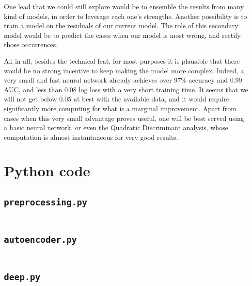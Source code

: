 \documentclass[a4paper,11pt,openany,extrafontsizes,oneside,article,twocolumn]{memoir}
\begin{document}
One lead that we could still explore would be to ensemble the results
from many kind of models, in order to leverage each one's
strengths. Another possibility is to train a model on the residuals of
our current model. The role of this secondary model would be to
predict the cases when our model is most wrong, and rectify those
occurrences.

All in all, besides the technical feat, for most purposes it is
plausible that there would be no strong incentive to keep making the
model more complex. Indeed, a very small and fast neural network
already achieves over 97\% accuracy and 0.99 AUC, and less than 0.08
log loss with a very short training time. It seems that we will not
get below 0.05 at best with the available data, and it would require
significantly more computing for what is a marginal improvement. Apart
from cases when this very small advantage proves useful, one will be
best served using a basic neural network, or even the Quadratic
Discriminant analysis, whose computation is almost instantaneous for
very good results.



\backmatter%
\onecolumn%

\chapter{Python code}

\section{\texttt{preprocessing.py}}

\inputminted[linenos,stepnumber=5]{python}{../preprocessing.py}

\section{\texttt{autoencoder.py}}

\inputminted[linenos,stepnumber=5]{python}{../autoencoder.py}

\section{\texttt{deep.py}}

\inputminted[linenos,stepnumber=5]{python}{../deep.py}



% 
\end{document}

